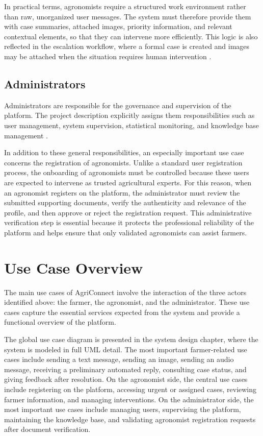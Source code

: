 In practical terms, agronomists require a structured work environment rather than raw, unorganized user messages. The system must therefore provide them with case summaries, attached images, priority information, and relevant contextual elements, so that they can intervene more efficiently. This logic is also reflected in the escalation workflow, where a formal case is created and images may be attached when the situation requires human intervention \cite{li2025llm,yin2025foundation}.

\subsection{Administrators}

Administrators are responsible for the governance and supervision of the platform. The project description explicitly assigns them responsibilities such as user management, system supervision, statistical monitoring, and knowledge base management \cite{li2025llm}.

In addition to these general responsibilities, an especially important use case concerns the registration of agronomists. Unlike a standard user registration process, the onboarding of agronomists must be controlled because these users are expected to intervene as trusted agricultural experts. For this reason, when an agronomist registers on the platform, the administrator must review the submitted supporting documents, verify the authenticity and relevance of the profile, and then approve or reject the registration request. This administrative verification step is essential because it protects the professional reliability of the platform and helps ensure that only validated agronomists can assist farmers.

\section{Use Case Overview}

The main use cases of AgriConnect involve the interaction of the three actors identified above: the farmer, the agronomist, and the administrator. These use cases capture the essential services expected from the system and provide a functional overview of the platform.

The global use case diagram is presented in the system design chapter, where the system is modeled in full UML detail. The most important farmer-related use cases include sending a text message, sending an image, sending an audio message, receiving a preliminary automated reply, consulting case status, and giving feedback after resolution. On the agronomist side, the central use cases include registering on the platform, accessing urgent or assigned cases, reviewing farmer information, and managing interventions. On the administrator side, the most important use cases include managing users, supervising the platform, maintaining the knowledge base, and validating agronomist registration requests after document verification.

